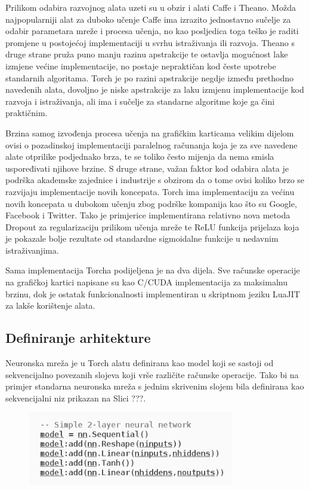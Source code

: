 \documentclass[lmodern, utf8, diplomski, numeric]{fer}
\begin{document}
Prilikom odabira razvojnog alata uzeti su u obzir i alati Caffe i Theano. Možda najpopularniji alat za duboko učenje Caffe ima izrazito jednostavno sučelje za odabir parametara mreže i procesa učenja, no kao posljedica toga teško je raditi promjene u postojećoj implementaciji u svrhu istraživanja ili razvoja. Theano s druge strane pruža puno manju razinu apstrakcije te ostavlja mogućnost lake izmjene većine implementacije, no postaje nepraktičan kod česte upotrebe standarnih algoritama.
Torch je po razini apstrakcije negdje između prethodno navedenih alata, dovoljno je niske apstrakcije za laku izmjenu implementacije kod razvoja i istraživanja, ali ima i sučelje za standarne algoritme koje ga čini praktičnim. 

Brzina samog izvođenja procesa učenja na grafičkim karticama velikim dijelom ovisi o pozadinskoj implementaciji paralelnog računanja koja je za sve navedene alate otprilike podjednako brza, te se toliko često mijenja da nema smisla uspoređivati njihove brzine. S druge strane, važan faktor kod odabira alata je podrška akademske zajednice i industrije s obzirom da o tome ovisi koliko brzo se razvijaju implementacije novih koncepata. Torch ima implementaciju za većinu novih koncepata u dubokom učenju zbog podrške kompanija kao što su Google, Facebook i Twitter.  Tako je primjerice implementirana relativno nova metoda Dropout za regularizaciju prilikom učenja mreže te ReLU funkcija prijelaza koja je pokazale bolje rezultate od standardne sigmoidalne funkcije u nedavnim istraživanjima.

Sama implementacija Torcha podijeljena je na dva dijela. Sve računske operacije na grafičkoj kartici napisane su kao C/CUDA implementacija za maksimalnu brzinu, dok je ostatak funkcionalnosti implementiran u skriptnom jeziku LuaJIT za lakše korištenje alata.  

\subsection{Definiranje arhitekture}
	
Neuronska mreža je u Torch alatu definirana kao model koji se sastoji od sekvencijalno povezanih slojeva koji vrše različite računske operacije.
Tako bi na primjer standarna neuronska mreža s jednim skrivenim slojem bila definirana kao sekvencijalni niz prikazan na Slici ???. 

\begin{figure}[ht!]
\centering
\includegraphics[width=9cm]{slike/nn_model.png}
\caption{}
\end{figure}
\end{document}
